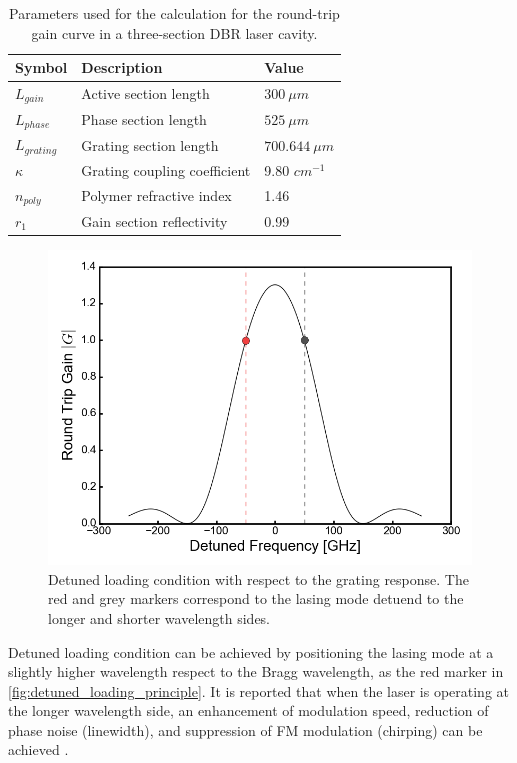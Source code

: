\begin{table}[ht]
    \centering
    \caption{Parameters used for the calculation for the round-trip gain curve in a three-section DBR laser cavity.}
    \label{tab:detuned_loading}
    \begin{tabular}{@{}lll@{}}
    \toprule
    Symbol        & Description                         & Value            \\ \midrule
    $L_{gain}$    & Active section length               & $300 \ \mu m$    \\
    $L_{phase}$   & Phase section length                & $525 \ \mu m$    \\
    $L_{grating}$ & Grating section length              & $700.644\ \mu m$ \\
    $\kappa$      & Grating coupling coefficient        & 9.80 $cm^{-1}$   \\
    $n_{poly}$    & Polymer refractive index            & 1.46             \\
    $r_1$         & Gain section  reflectivity          & 0.99             \\ \bottomrule
    \end{tabular}
\end{table}

\begin{figure}[H]
    \centering
    \includegraphics[width=.7\linewidth]{figures/detuned_loading_principle.png}
    \caption{Detuned loading condition with respect to the grating response. The red and grey markers correspond to the lasing mode detuend to the longer and shorter wavelength sides.}
    \label{fig:detuned_loading_principle}
\end{figure}

Detuned loading condition can be achieved by positioning the lasing mode at a slightly higher wavelength respect to the Bragg wavelength, as the red marker in \autoref{fig:detuned_loading_principle}. It is reported that when the laser is operating at the longer wavelength side, an enhancement of modulation speed, reduction of phase noise (linewidth), and suppression of FM modulation (chirping) can be achieved \cite{vahala1984detuned}. 

